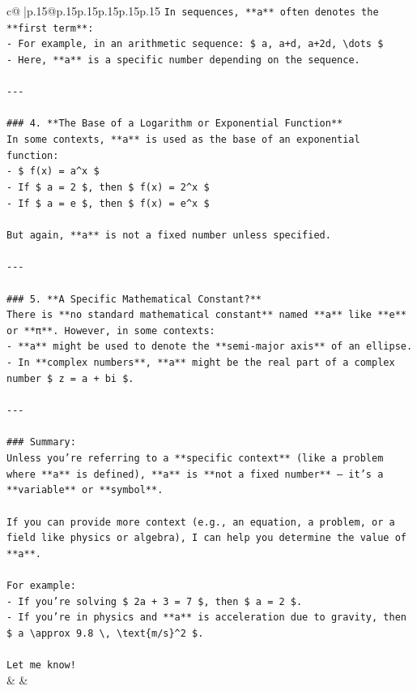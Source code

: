 \documentclass{article}
\begin{document}
{\begin{supertabular}{c@{$\;$}|p{.15\linewidth}@{}p{.15\linewidth}p{.15\linewidth}p{.15\linewidth}p{.15\linewidth}p{.15\linewidth}}
{{{\texttt{In sequences, **a** often denotes the **first term**:} \\
\texttt{{-} For example, in an arithmetic sequence: \$ a, a+d, a+2d, \textbackslash{}dots \$} \\
\texttt{{-} Here, **a** is a specific number depending on the sequence.} \\
\\ 
\texttt{{-}{-}{-}} \\
\\ 
\texttt{\#\#\# 4. **The Base of a Logarithm or Exponential Function**} \\
\texttt{In some contexts, **a** is used as the base of an exponential function:} \\
\texttt{{-} \$ f(x) = a\^{}x \$} \\
\texttt{{-} If \$ a = 2 \$, then \$ f(x) = 2\^{}x \$} \\
\texttt{{-} If \$ a = e \$, then \$ f(x) = e\^{}x \$} \\
\\ 
\texttt{But again, **a** is not a fixed number unless specified.} \\
\\ 
\texttt{{-}{-}{-}} \\
\\ 
\texttt{\#\#\# 5. **A Specific Mathematical Constant?**} \\
\texttt{There is **no standard mathematical constant** named **a** like **e** or **π**. However, in some contexts:} \\
\texttt{{-} **a** might be used to denote the **semi{-}major axis** of an ellipse.} \\
\texttt{{-} In **complex numbers**, **a** might be the real part of a complex number \$ z = a + bi \$.} \\
\\ 
\texttt{{-}{-}{-}} \\
\\ 
\texttt{\#\#\# Summary:} \\
\texttt{Unless you're referring to a **specific context** (like a problem where **a** is defined), **a** is **not a fixed number** — it's a **variable** or **symbol**.} \\
\\ 
\texttt{If you can provide more context (e.g., an equation, a problem, or a field like physics or algebra), I can help you determine the value of **a**.} \\
\\ 
\texttt{For example:} \\
\texttt{{-} If you're solving \$ 2a + 3 = 7 \$, then \$ a = 2 \$.} \\
\texttt{{-} If you're in physics and **a** is acceleration due to gravity, then \$ a \textbackslash{}approx 9.8 \textbackslash{}, \textbackslash{}text\{m/s\}\^{}2 \$.} \\
\\ 
\texttt{Let me know!} \\
            }
        }
    }
    & & \\ \\


\end{supertabular}}
\end{document}
